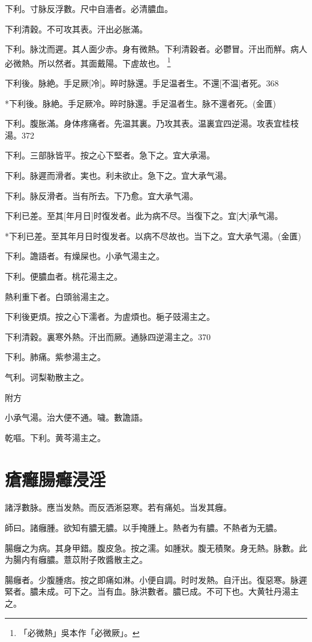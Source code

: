 \documentclass[12pt,twoside,UTF8,b5paper]{ctexbook}
\begin{document}
下利。寸脉反浮數。尺中自濇者。必清膿血。

下利清穀。不可攻其表。汗出必胀滿。

下利。脉沈而遲。其人面少赤。身有微熱。下利清穀者。必鬱冒。汗出而觧。病人必微熱。所以然者。其面戴陽。下虗故也。
	\footnote{「必微熱」吳本作「必微厥」。}

下利後。脉絶。手足厥[冷]。晬时脉還。手足温者生。不還[不温]者死。368

*下利後。脉絶。手足厥冷。晬时脉還。手足温者生。脉不還者死。(金匱)

下利。腹胀滿。身体疼痛者。先温其裏。乃攻其表。温裏宜四逆湯。攻表宜桂枝湯。372

下利。三部脉皆平。按之心下堅者。急下之。宜大承湯。

下利。脉遲而滑者。実也。利未欲止。急下之。宜大承气湯。

下利。脉反滑者。当有所去。下乃愈。宜大承气湯。

下利已差。至其[年月日]时復发者。此为病不尽。当復下之。宜[大]承气湯。

*下利已差。至其年月日时復发者。以病不尽故也。当下之。宜大承气湯。(金匱)

下利。譫語者。有燥屎也。小承气湯主之。

下利。便膿血者。桃花湯主之。

熱利重下者。白頭翁湯主之。

下利後更煩。按之心下濡者。为虗煩也。梔子豉湯主之。

下利清穀。裏寒外熱。汗出而厥。通脉四逆湯主之。370

下利。肺痛。紫参湯主之。

气利。诃梨勒散主之。

附方

小承气湯。治大便不通。噦。數譫語。

乾嘔。下利。黄芩湯主之。

\chapter{瘡癰腸癰浸淫}

諸浮數脉。應当发熱。而反洒淅惡寒。若有痛処。当发其癰。

師曰。諸癰腫。欲知有膿无膿。以手掩腫上。熱者为有膿。不熱者为无膿。

腸癰之为病。其身甲錯。腹皮急。按之濡。如腫狀。腹无積聚。身无熱。脉數。此为腸内有癰膿。薏苡附子敗醬散主之。

腸癰者。少腹腫痞。按之即痛如淋。小便自調。时时发熱。自汗出。復惡寒。脉遲緊者。膿未成。可下之。当有血。脉洪數者。膿已成。不可下也。大黄牡丹湯主之。
\end{document}
